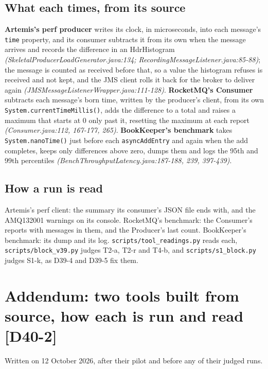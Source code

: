 \documentclass[11pt]{article}
\newcommand{\gl}[1]{{\color{soft}\itshape\small (#1)}}
\newcommand{\chgold}[1]{\,{\color{oldcol}\bfseries\footnotesize[#1]}}
\begin{document}
\subsection*{What each times, from its source}
\textbf{Artemis's perf producer} writes its clock, in microseconds, into each message's
\texttt{time} property, and its consumer subtracts it from its own when the message arrives and
records the difference in an HdrHistogram \gl{SkeletalProducerLoadGenerator.java:134;
RecordingMessageListener.java:85-88}; the message is counted as received before that, so a value
the histogram refuses is received and not kept, and the JMS client rolls it back for the broker to
deliver again \gl{JMSMessageListenerWrapper.java:111-128}. \textbf{RocketMQ's Consumer} subtracts
each message's born time, written by the producer's client, from its own
\texttt{System.currentTimeMillis()}, adds the difference to a total and raises a maximum that
starts at 0 only past it, resetting the maximum at each report \gl{Consumer.java:112, 167-177, 265}.
\textbf{BookKeeper's benchmark} takes \texttt{System.nanoTime()} just before each
\texttt{asyncAddEntry} and again when the add completes, keeps only differences above zero, dumps
them and logs the 95th and 99th percentiles \gl{BenchThroughputLatency.java:187-188, 239,
397-439}.

\subsection*{How a run is read}
Artemis's perf client: the summary its consumer's JSON file ends with, and the AMQ132001 warnings
on its console. RocketMQ's benchmark: the Consumer's reports with messages in them, and the
Producer's last count. BookKeeper's benchmark: its dump and its log. \texttt{scripts/tool\_readings.py}
reads each, \texttt{scripts/block\_v39.py} judges T2-a, T2-r and T4-b, and
\texttt{scripts/s1\_block.py} judges S1-k, as D39-4 and D39-5 fix them.

\section[Addendum: two tools built from source]{Addendum: two tools built from source, how each is run and read\protect\chgold{D40-2}}\label{sec:addendum-v40}
Written on 12 October 2026, after their pilot and before any of their judged runs.
\end{document}
